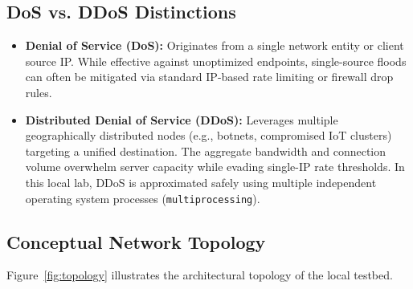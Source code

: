 \documentclass[11pt,a4paper]{article}
\begin{document}
\subsection{DoS vs. DDoS Distinctions}
\begin{itemize}[leftmargin=*]
    \item \textbf{Denial of Service (DoS):} Originates from a single network entity or client source IP. While effective against unoptimized endpoints, single-source floods can often be mitigated via standard IP-based rate limiting or firewall drop rules.
    \item \textbf{Distributed Denial of Service (DDoS):} Leverages multiple geographically distributed nodes (e.g., botnets, compromised IoT clusters) targeting a unified destination. The aggregate bandwidth and connection volume overwhelm server capacity while evading single-IP rate thresholds. In this local lab, DDoS is approximated safely using multiple independent operating system processes (\texttt{multiprocessing}).
\end{itemize}

\subsection{Conceptual Network Topology}
Figure~\ref{fig:topology} illustrates the architectural topology of the local testbed.
\end{document}
